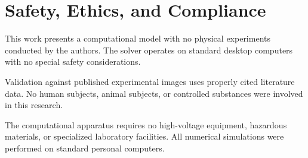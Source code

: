 \section{Safety, Ethics, and Compliance}

This work presents a computational model with no physical experiments conducted by the authors. The solver operates on standard desktop computers with no special safety considerations.

Validation against published experimental images uses properly cited literature data. No human subjects, animal subjects, or controlled substances were involved in this research.

The computational apparatus requires no high-voltage equipment, hazardous materials, or specialized laboratory facilities. All numerical simulations were performed on standard personal computers.
